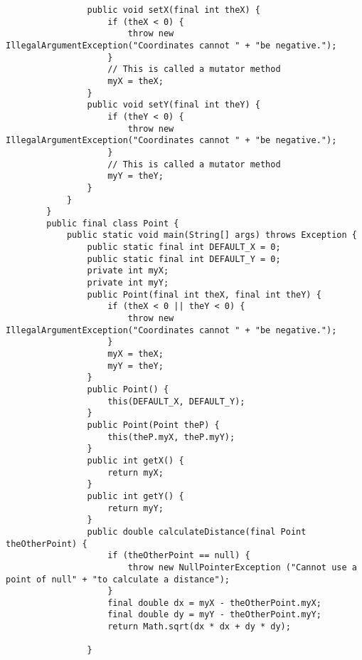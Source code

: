 \documentclass{article}
\begin{document}
\begin{lstlisting}
                public void setX(final int theX) {
                    if (theX < 0) {
                        throw new IllegalArgumentException("Coordinates cannot " + "be negative.");
                    }
                    // This is called a mutator method 
                    myX = theX;
                }
                public void setY(final int theY) {
                    if (theY < 0) {
                        throw new IllegalArgumentException("Coordinates cannot " + "be negative.");
                    }
                    // This is called a mutator method 
                    myY = theY;
                }
            }
        }
        public final class Point {
            public static void main(String[] args) throws Exception {
                public static final int DEFAULT_X = 0;
                public static final int DEFAULT_Y = 0;
                private int myX;
                private int myY;
                public Point(final int theX, final int theY) {
                    if (theX < 0 || theY < 0) {
                        throw new IllegalArgumentException("Coordinates cannot " + "be negative.");
                    }
                    myX = theX;
                    myY = theY;
                }
                public Point() {
                    this(DEFAULT_X, DEFAULT_Y);
                }
                public Point(Point theP) {
                    this(theP.myX, theP.myY);
                }
                public int getX() {
                    return myX;
                }
                public int getY() {
                    return myY;
                }
                public double calculateDistance(final Point theOtherPoint) {
                    if (theOtherPoint == null) {
                        throw new NullPointerException ("Cannot use a point of null" + "to calculate a distance");
                    }
                    final double dx = myX - theOtherPoint.myX;
                    final double dy = myY - theOtherPoint.myY;
                    return Math.sqrt(dx * dx + dy * dy);
            
                }
        

\end{lstlisting}
\end{document}
